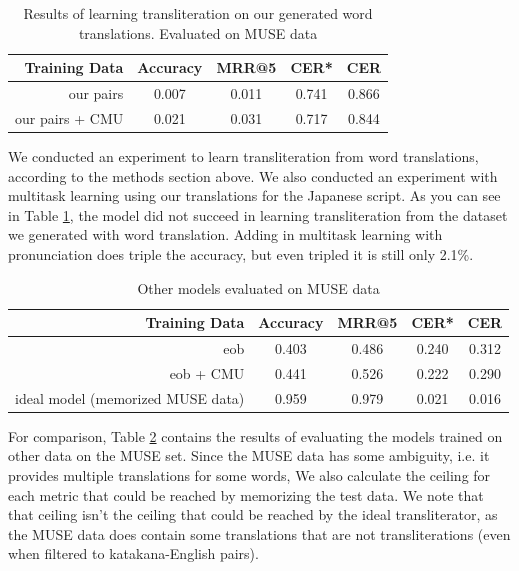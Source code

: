 \documentclass{article}
\begin{document}
\begin{table}[h]
  \centering
  \begin{tabular}{r | c c c c}
    \toprule
    Training Data & Accuracy & MRR@5 & CER* & CER \\
    \midrule
    our pairs & 0.007 & 0.011 & 0.741 & 0.866 \\
    our pairs + CMU & 0.021 & 0.031 & 0.717 & 0.844 \\
    \bottomrule
  \end{tabular}
  \caption{Results of learning transliteration on our generated word
    translations. Evaluated on MUSE data}
  \label{tab:our-muse}
\end{table}

We conducted an experiment to learn transliteration from word translations,
according to the methods section above.
We also conducted an experiment with multitask learning
using our translations for the Japanese script.
As you can see in Table \ref{tab:our-muse},
the model did not succeed in learning transliteration
from the dataset we generated with word translation.
Adding in multitask learning with pronunciation does triple the accuracy,
but even tripled it is still only 2.1\%.

\begin{table}[h]
  \centering
  \begin{tabular}{r | c c c c}
    \toprule
    Training Data & Accuracy & MRR@5 & CER* & CER \\
    \midrule
    eob & 0.403 & 0.486 & 0.240 & 0.312 \\
    eob + CMU & 0.441 & 0.526 & 0.222 & 0.290 \\
    \midrule
    ideal model (memorized MUSE data) & 0.959 & 0.979 & 0.021 & 0.016\\
    \bottomrule
  \end{tabular}
  \caption{Other models evaluated on MUSE data}
  \label{tab:other-muse}
\end{table}

For comparison,
Table \ref{tab:other-muse} contains the results of evaluating
the models trained on other data on the MUSE set.
Since the MUSE data has some ambiguity,
i.e. it provides multiple translations for some words,
We also calculate the ceiling for each metric
that could be reached by memorizing the test data.
We note that that ceiling isn't
the ceiling that could be reached by the ideal transliterator,
as the MUSE data does contain some translations that are not transliterations
(even when filtered to katakana-English pairs).
\end{document}
